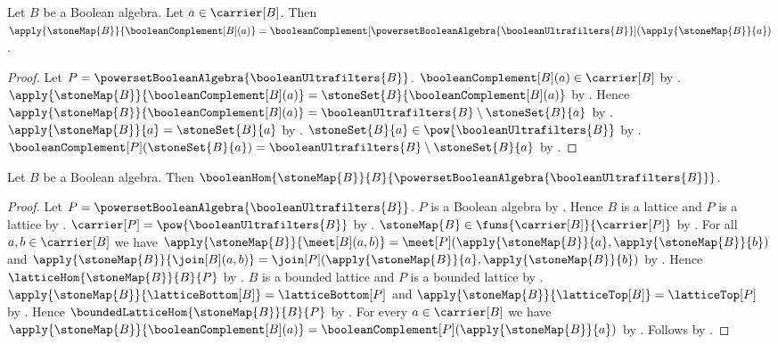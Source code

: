 \begin{proposition}\label{stone_map_complement}
    Let $B$ be a Boolean algebra.
    Let $a\in\carrier[B]$.
    Then $\apply{\stoneMap{B}}{\booleanComplement[B](a)}=
        \booleanComplement[
            \powersetBooleanAlgebra{\booleanUltrafilters{B}}]
            (\apply{\stoneMap{B}}{a})$.
\end{proposition}
\begin{proof}
    Let $P=\powersetBooleanAlgebra{\booleanUltrafilters{B}}$.
    $\booleanComplement[B](a)\in\carrier[B]$ by
        .
    $\apply{\stoneMap{B}}{\booleanComplement[B](a)}=
        \stoneSet{B}{\booleanComplement[B](a)}$ by
        .
    Hence $\apply{\stoneMap{B}}{\booleanComplement[B](a)}=
        \booleanUltrafilters{B}\setminus\stoneSet{B}{a}$ by
        .
    $\apply{\stoneMap{B}}{a}=\stoneSet{B}{a}$ by
        .
    $\stoneSet{B}{a}\in\pow{\booleanUltrafilters{B}}$ by
        .
    $\booleanComplement[P](\stoneSet{B}{a})=
        \booleanUltrafilters{B}\setminus\stoneSet{B}{a}$ by
        .
\end{proof}

\begin{theorem}\label{stone_map_is_boolean_hom}
    Let $B$ be a Boolean algebra.
    Then $\booleanHom
        {\stoneMap{B}}
        {B}
        {\powersetBooleanAlgebra{\booleanUltrafilters{B}}}$.
\end{theorem}
\begin{proof}
    Let $P=\powersetBooleanAlgebra{\booleanUltrafilters{B}}$.
    $P$ is a Boolean algebra by
        .
    Hence $B$ is a lattice and $P$ is a lattice by
        .
    $\carrier[P]=\pow{\booleanUltrafilters{B}}$ by
        .
    $\stoneMap{B}\in\funs{\carrier[B]}{\carrier[P]}$ by
        .
    For all $a,b\in\carrier[B]$ we have
        $\apply{\stoneMap{B}}{\meet[B](a,b)}=
            \meet[P](\apply{\stoneMap{B}}{a},
                \apply{\stoneMap{B}}{b})$ and
        $\apply{\stoneMap{B}}{\join[B](a,b)}=
            \join[P](\apply{\stoneMap{B}}{a},
                \apply{\stoneMap{B}}{b})$ by
        .
    Hence $\latticeHom{\stoneMap{B}}{B}{P}$ by
        .
    $B$ is a bounded lattice and $P$ is a bounded lattice by
        .
    $\apply{\stoneMap{B}}{\latticeBottom[B]}=
        \latticeBottom[P]$ and
        $\apply{\stoneMap{B}}{\latticeTop[B]}=
        \latticeTop[P]$ by
        .
    Hence $\boundedLatticeHom{\stoneMap{B}}{B}{P}$ by
        .
    For every $a\in\carrier[B]$ we have
        $\apply{\stoneMap{B}}{\booleanComplement[B](a)}=
            \booleanComplement[P](\apply{\stoneMap{B}}{a})$ by
        .
    Follows by .
\end{proof}

